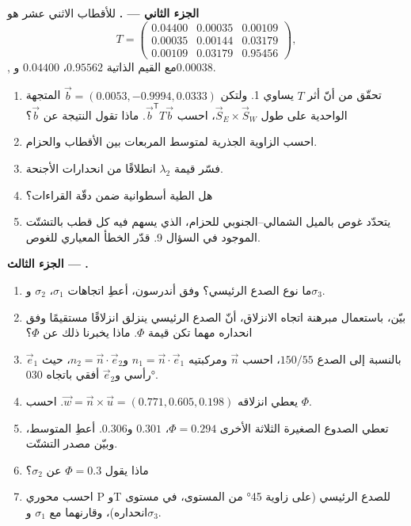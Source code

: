 \begin{problem}
\medskip\noindent\textbf{الجزء الثاني --- .}
 للأقطاب الاثني عشر هو
\[
  T = \begin{pmatrix} 0.04400 & 0.00035 & 0.00109\\ 0.00035 & 0.00144 & 0.03179\\
  0.00109 & 0.03179 & 0.95456 \end{pmatrix},
\],
مع القيم الذاتية $0.95562$، $0.04400$ و$0.00038$.
\begin{enumerate}[resume]
  \item تحقّق من أنّ أثر $T$ يساوي 1. ولتكن $\vec b = (0.0053, -0.9994,
        0.0333)$ المتجهة الواحدية على طول $\vec S_E\times\vec S_W$، احسب
        $\vec b^{\mathsf T}T\vec b$. ماذا تقول النتيجة عن $\vec b$؟
  \item احسب الزاوية الجذرية لمتوسط المربعات بين الأقطاب والحزام.
  \item فسّر قيمة $\lambda_2$ انطلاقًا من انحدارات الأجنحة.
  \item هل الطية أسطوانية ضمن دقّة القراءات؟
  \item يتحدّد غوص  بالميل الشمالي--الجنوبي للحزام، الذي يسهم فيه
        كل قطب بالتشتّت الموجود في السؤال 9.
        قدّر الخطأ المعياري للغوص.
\end{enumerate}

\medskip\noindent\textbf{الجزء الثالث --- .}
\begin{enumerate}[resume]
  \item ما نوع الصدع الرئيسي؟ وفق أندرسون، أعطِ
        اتجاهات $\sigma_1$، $\sigma_2$ و$\sigma_3$.
  \item بيّن، باستعمال مبرهنة اتجاه الانزلاق، أنّ الصدع الرئيسي
        ينزلق انزلاقًا مستقيمًا وفق انحداره مهما تكن قيمة $\Phi$. ماذا يخبرنا
        ذلك عن $\Phi$؟
  \item بالنسبة إلى الصدع $150/55$، احسب $\vec n$ ومركبتيه $n_1 =
        \vec n\cdot\vec e_1$ و$n_2 = \vec n\cdot\vec e_2$، حيث $\vec e_1$
        رأسي و$\vec e_2$ أفقي باتجاه \ang{030}.
  \item يعطي انزلاقه $\vec w = \vec n\times\vec u = (0.771, 0.605, 0.198)$.
        احسب $\Phi$.
  \item تعطي الصدوع الصغيرة الثلاثة الأخرى $\Phi = 0.294$، $0.301$
        و$0.306$. أعطِ المتوسط، وبيّن مصدر التشتّت.
  \item ماذا يقول $\Phi = 0.3$ عن $\sigma_2$؟
  \item احسب محوري P وT للصدع الرئيسي (على زاوية \ang{45} من
        المستوى، في مستوى انحداره)، وقارنهما مع $\sigma_1$
        و$\sigma_3$.
\end{enumerate}


\end{problem}
